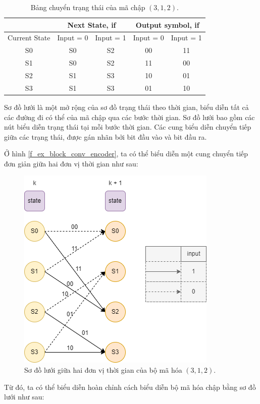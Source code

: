 \begin{table}[H]
	\centering
	\begin{tabular}{|c|c|c|c|c|}
		\hline
		& \multicolumn{2}{c|}{Next State, if} & \multicolumn{2}{c|}{Output symbol, if} \\ \hline
		Current State & Input = 0 & Input = 1 & Input = 0 & Input = 1 \\ \hline
		S0 & S0 & S2 & 00 & 11 \\ \hline
		S1 & S0 & S2 & 11 & 00 \\ \hline
		S2 & S1 & S3 & 10 & 01 \\ \hline
		S3 & S1 & S3 & 01 & 10 \\ \hline
	\end{tabular}
	\caption{Bảng chuyển trạng thái của mã chập \( (3,1,2) \).}
	\label{t_fsm_conv_encoder}
\end{table}

Sơ đồ lưới là một mở rộng của sơ đồ trạng thái theo thời gian, biểu diễn tất cả các đường đi có thể của mã chập qua các bước thời gian. Sơ đồ lưới bao gồm các nút biểu diễn trạng thái tại mỗi bước thời gian. Các cung biểu diễn chuyển tiếp giữa các trạng thái, được gán nhãn bởi bit đầu vào và bit đầu ra.

Ở hình \ref{f_ex_block_conv_encoder}, ta có thể biểu diễn một cung chuyển tiếp đơn giản giữa hai đơn vị thời gian như sau:

\begin{figure}[H]
	\centering
	\includegraphics[width=.5\linewidth]{sections/pic/cosolythuyet/trellis-fsm-convolutional-code-coban.png}
	\caption{Sơ đồ lưới giữa hai đơn vị thời gian của bộ mã hóa $(3, 1, 2)$.}
	\label{f_trellis_unit_conv_encoder}
\end{figure}

Từ đó, ta có thể biểu diễn hoàn chỉnh cách biểu diễn bộ mã hóa chập bằng sơ đồ lưới như sau:

